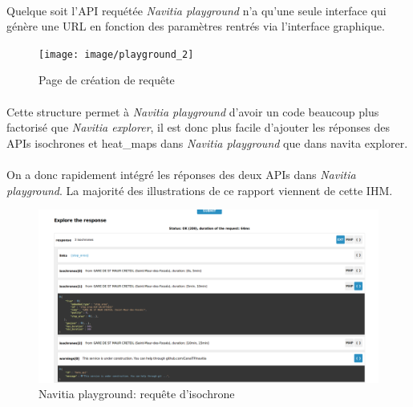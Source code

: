 \documentclass[a4paper]{report}
\begin{document}
\paragraph{} Quelque soit l'API requétée \emph{Navitia playground} n'a qu'une seule interface qui génère une URL en fonction des paramètres rentrés via l'interface graphique.

\begin{figure}[H]
	\begin{center}
		\texttt{[image: image/playground\_2]}
		\caption{Page de création de requête}
		\label{Page de création de requête}
	\end{center}
\end{figure}

\paragraph{} Cette structure permet à \emph{Navitia playground} d'avoir un code beaucoup plus factorisé que \emph{Navitia explorer}, il est donc plus facile d'ajouter les réponses des APIs isochrones et heat\_maps dans \emph{Navitia playground} que dans navita explorer. 

\paragraph{} On a donc rapidement intégré les réponses des deux APIs dans \emph{Navitia playground}. La majorité des illustrations de ce rapport viennent de cette IHM.  

\begin{figure}[H]
	\begin{center}
		\includegraphics[width=400pt]{image/n_p_flux_json}
		\caption{Navitia playground: requête d'isochrone}
		\label{Navitia playground: requête d'isochrone}
	\end{center}
\end{figure}
\end{document}

